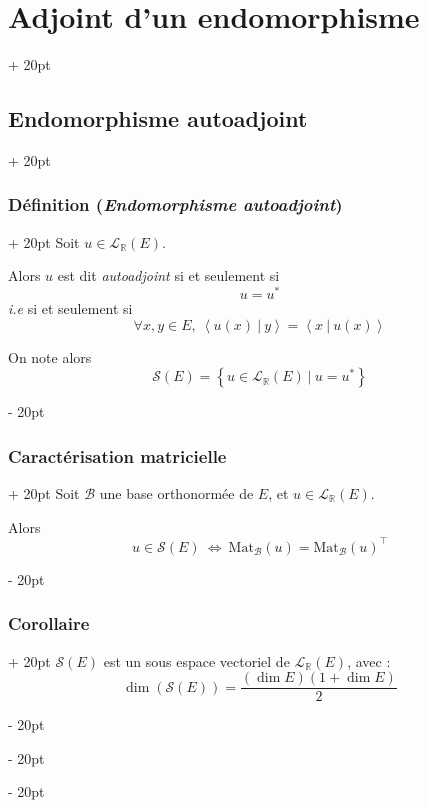 \documentclass[a4paper, 12pt, twoside]{article}
\newcommand{\R}{\mathbb{R}} %
\newcommand{\lr}[1]{\left( #1 \right)}
\newcommand{\set}[1]{\left\{ #1 \right\}}
\newcommand{\lrangle}[1]{\left\langle #1 \right\rangle}
\newcommand{\ssi}{\ \Leftrightarrow \ }
\newcommand{\ps}[2]{\lrangle{#1\ |\ #2}}
\newcommand{\ind}[1][20pt]{\advance\leftskip + #1}
\newcommand{\deind}[1][20pt]{\advance\leftskip - #1}
\newenvironment{indt}[2][20pt]{#2 \par \ind[#1]}{\par \deind} %
\begin{document}
\begin{indt}{\section{Adjoint d'un endomorphisme}}
        \begin{indt}{\subsection{Endomorphisme autoadjoint}}
            \begin{indt}{\subsubsection{Définition (\textit{Endomorphisme autoadjoint})}}
                Soit $u \in \mathcal L_\R(E)$.

                Alors $u$ est dit \emph{autoadjoint} si et seulement si
                \[
                    u = u^*
                \]
                \textit{i.e} si et seulement si
                \[
                    \forall x, y \in E,\
                    \ps{u(x)} y = \ps x {u(x)}
                \]

                \vspace{6pt}
                
                On note alors
                \[
                    \mathscr S(E) = \set{u \in \mathcal L_\R(E)\ |\ u = u^*}
                \]
            \end{indt}

            \vspace{12pt}
            
            \begin{indt}{\subsubsection{Caractérisation matricielle}}
                Soit $\mathcal B$ une base orthonormée de $E$, et $u \in \mathcal L_\R(E)$.

                Alors
                \[
                    u \in \mathscr S(E)
                    \ssi
                    \mathrm{Mat}_{\mathcal B}(u) = \mathrm{Mat}_{\mathcal B}(u)^\top
                \]
            \end{indt}

            \vspace{12pt}
            
            \begin{indt}{\subsubsection{Corollaire}}
                $\mathscr S(E)$ est un sous espace vectoriel de $\mathcal L_\R(E)$, avec :
                \[
                    \dim\!\lr{\mathscr S(E)} = \dfrac{(\dim E)(1 + \dim E)}{2}
                \]
            \end{indt}


\end{indt}
\end{indt}
\end{document}

